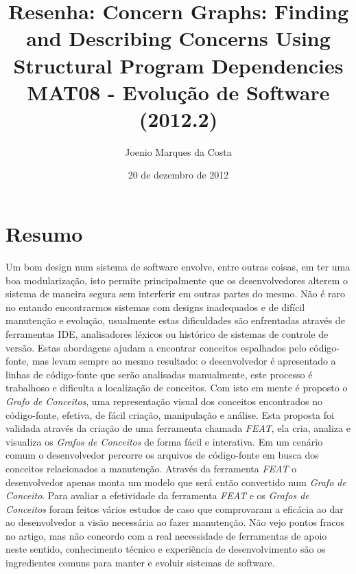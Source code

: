 \documentclass[12pt]{article}
\title{Resenha: Concern Graphs: Finding and Describing Concerns Using
 Structural Program Dependencies\cite{ConcernGraphs} \\
 \large MAT08 - Evolução de Software (2012.2)}
\author{Joenio Marques da Costa}
\date{20 de dezembro de 2012}
\begin{document}
\maketitle

\section*{Resumo}

Um bom design num sistema de software envolve, entre outras coisas, em ter uma
boa modularização, isto permite principalmente que os desenvolvedores alterem o
sistema de maneira segura sem interferir em outras partes do mesmo.  Não é raro
no entando encontrarmos sistemas com designs inadequados e de difícil
manutenção e evolução, usualmente estas dificuldades são enfrentadas através de
ferramentas IDE, analisadores léxicos ou histórico de sistemas de controle de
versão. Estas abordagens ajudam a encontrar conceitos espalhados pelo
código-fonte, mas levam sempre ao mesmo resultado: o desenvolvedor é
apresentado a linhas de código-fonte que serão analisadas manualmente, este
processo é trabalhoso e dificulta a localização de conceitos. Com isto em mente
é proposto o {\it Grafo de Conceitos}, uma representação visual dos conceitos
encontrados no código-fonte, efetiva, de fácil criação, manipulação e análise.
Esta proposta foi validada através da criação de uma ferramenta chamada {\it
FEAT}, ela cria, analiza e visualiza os {\it Grafos de Conceitos} de forma
fácil e interativa. Em um cenário comum o desenvolvedor percorre os arquivos de
código-fonte em busca dos conceitos relacionados a manutenção. Através da
ferramenta {\it FEAT} o desenvolvedor apenas monta um modelo que será então
convertido num {\it Grafo de Conceito}. Para avaliar a efetividade da
ferramenta {\it FEAT} e os {\it Grafos de Conceitos} foram feitos vários
estudos de caso que comprovaram a eficácia ao dar ao desenvolvedor a visão
necessária ao fazer manutenção. Não vejo pontos fracos no artigo, mas não
concordo com a real necessidade de ferramentas de apoio neste sentido,
conhecimento técnico e experiência de desenvolvimento são os ingredientes
comuns para manter e evoluir sistemas de software.


\end{document}
